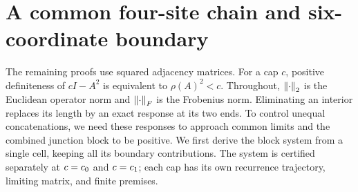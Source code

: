 \section{A common four-site chain and six-coordinate boundary}
\label{sec:chain}

The remaining proofs use squared adjacency matrices. For a cap $c$,
positive definiteness of $cI-A^2$ is equivalent to $\rho(A)^2<c$.
Throughout, $\left\lVert\cdot\right\rVert_2$ is the Euclidean operator norm and
$\left\lVert\cdot\right\rVert_F$ is the Frobenius norm.
Eliminating an interior replaces its length by an exact response at its
two ends. To control unequal concatenations, we need these responses to
approach common limits and the combined junction block to be positive.
We first derive the block system from a single cell, keeping all its
boundary contributions. The system is certified separately at
$c=c_0$ and $c=c_1$; each cap has its own recurrence trajectory,
limiting matrix, and finite premises.

